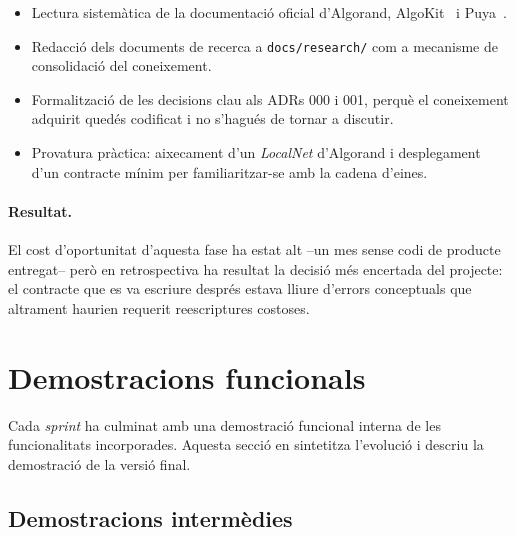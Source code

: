 \begin{itemize}
    \item Lectura sistemàtica de la documentació oficial d'Algorand, AlgoKit~\cite{algorandfoundation2024algokit} i
    Puya~\cite{algorandfoundation2024puya}.

    \item Redacció dels documents de recerca a \texttt{docs/research/} com a mecanisme de consolidació del coneixement.

    \item Formalització de les decisions clau als \acp{ADR} 000 i 001, perquè el coneixement adquirit quedés codificat i
    no s'hagués de tornar a discutir.

    \item Provatura pràctica: aixecament d'un \emph{LocalNet} d'Algorand i desplegament d'un contracte mínim per
    familiaritzar-se amb la cadena d'eines.
\end{itemize}

\paragraph{Resultat.} El cost d'oportunitat d'aquesta fase ha estat
alt --un mes sense codi de producte entregat-- però en retrospectiva ha resultat la decisió més encertada del projecte:
el contracte que es va escriure després estava lliure d'errors conceptuals que altrament haurien requerit reescriptures
costoses.



\section{Demostracions funcionals}
\label{sec:demos}

Cada \emph{sprint} ha culminat amb una demostració funcional interna de les funcionalitats incorporades.
Aquesta secció en sintetitza l'evolució i descriu la demostració de la versió final.

\subsection{Demostracions intermèdies}
\label{subsec:demostracions-intermedies}

